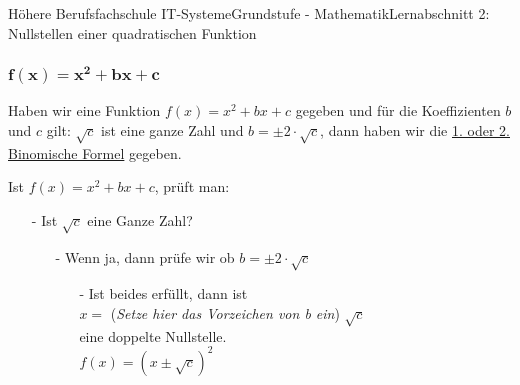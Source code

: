 \documentclass[11pt,twocolumn,oneside,openany,headings=optiontotoc,11pt,numbers=noenddot]{article}
\begin{document}
\begin{worksheet}{Höhere Berufsfachschule IT-Systeme}{Grundstufe - Mathematik}{Lernabschnitt 2: Nullstellen einer quadratischen Funktion}
		\subsubsection*{\(\mathbf{f(x) = x^2 + bx + c}\)}
		Haben wir eine Funktion \(f(x) = x^2 + bx + c\) gegeben und für die Koeffizienten \(b\) und \(c\) gilt: \(\sqrt{c}\) ist eine ganze Zahl und \(b = \pm{}2\cdot\sqrt{c}\), dann haben wir die \underline{1. oder 2. Binomische Formel} gegeben.\\
		\par\noindent
		Ist \(f(x) = x^2 + bx + c\), prüft man:
		\begin{itemize}
			\item[-] Ist \(\sqrt{c}\) eine Ganze Zahl?
			\begin{itemize}
				\item[-] Wenn ja, dann prüfe wir ob \( b = \pm{}2\cdot\sqrt{c}\)
				\begin{itemize}
					\item[-] Ist beides erfüllt, dann ist\\
					\(x =\) (\textit{\tiny{Setze hier das Vorzeichen von b ein}}) \(\sqrt{c}\)\\
					eine doppelte Nullstelle.\\
					\(f(x) = (x\pm\sqrt{c})^2\)
				\end{itemize}
			\end{itemize}
		\end{itemize}

\end{worksheet}
\end{document}
